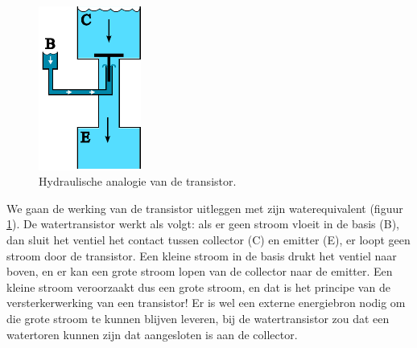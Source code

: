 \documentclass{article}
\begin{document}
			\begin{figure}[htbp]
				\centering
				\includegraphics[width=0.3\textwidth]{watertransistor}
				\caption{Hydraulische analogie van de transistor.}
				\label{fig:watertransistor}
			\end{figure}

			We gaan de werking van de transistor uitleggen met zijn waterequivalent (figuur \ref{fig:watertransistor}). De watertransistor werkt als volgt: als er geen stroom vloeit in de basis (B), dan sluit het ventiel het contact tussen collector (C) en emitter (E), er loopt geen stroom door de transistor. Een kleine stroom in de basis drukt het ventiel naar boven, en er kan een grote stroom lopen van de collector naar de emitter. Een kleine stroom veroorzaakt dus een grote stroom, en dat is het principe van de versterkerwerking van een transistor! Er is wel een externe energiebron nodig om die grote stroom te kunnen blijven leveren, bij de watertransistor zou dat een watertoren kunnen zijn dat aangesloten is aan de collector.

			
\end{document}
